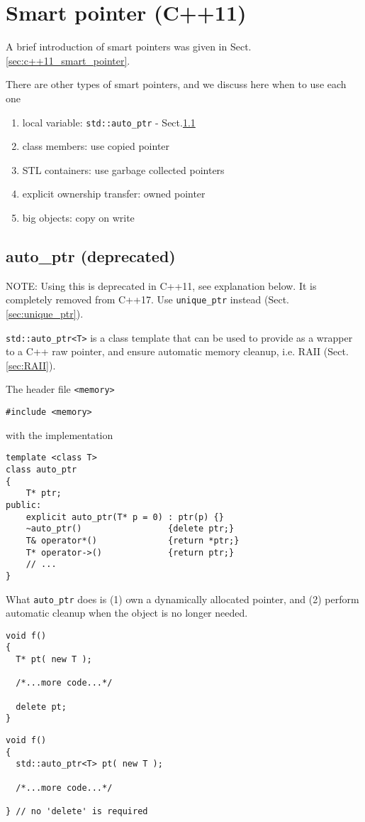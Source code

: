 \section{Smart pointer (C++11)}
\label{sec:smart_pointer}

A brief introduction of smart pointers was given in
Sect.\ref{sec:c++11_smart_pointer}. 

There are other types of smart pointers, and we discuss here when to use each
one
\begin{enumerate}
  \item local variable: \verb!std::auto_ptr! - Sect.\ref{sec:auto_ptr}
  \item class members: use copied pointer
  \item STL containers: use garbage collected pointers 
  \item explicit ownership transfer: owned pointer
  \item big objects: copy on write
\end{enumerate}

\subsection{auto\_ptr (deprecated)}
\label{sec:auto_ptr}

NOTE: Using this is deprecated in C++11, see explanation below. It is completely
removed from C++17. Use \verb!unique_ptr! instead (Sect.\ref{sec:unique_ptr}).

\verb!std::auto_ptr<T>! is a class template that can be used to provide as a
wrapper to a C++ raw pointer, and ensure automatic memory cleanup, i.e. RAII
(Sect.\ref{sec:RAII}).


The header file \verb!<memory>!
\begin{verbatim}
#include <memory>
\end{verbatim}
with the implementation
\begin{lstlisting}
template <class T> 
class auto_ptr
{
    T* ptr;
public:
    explicit auto_ptr(T* p = 0) : ptr(p) {}
    ~auto_ptr()                 {delete ptr;}
    T& operator*()              {return *ptr;}
    T* operator->()             {return ptr;}
    // ...
}
\end{lstlisting}

What \verb!auto_ptr! does is (1) own a dynamically allocated pointer,
and (2) perform automatic cleanup when the object is no longer needed.
\begin{multicols}{2}
\begin{lstlisting}
void f()
{
  T* pt( new T );

  /*...more code...*/

  delete pt;
}
\end{lstlisting}
\columnbreak
\begin{lstlisting}
void f()
{
  std::auto_ptr<T> pt( new T );

  /*...more code...*/

} // no 'delete' is required
\end{lstlisting}
\end{multicols}

